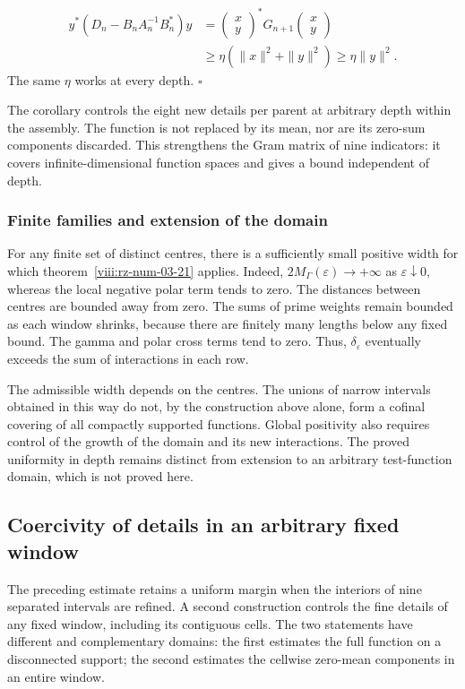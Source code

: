 \[
\begin{aligned}
y^*(D_n-B_nA_n^{-1}B_n^*)y
&=\begin{pmatrix}x\\y\end{pmatrix}^*G_{n+1}
\begin{pmatrix}x\\y\end{pmatrix}\\
&\geq\eta(\|x\|^2+\|y\|^2)\geq\eta\|y\|^2.
\end{aligned}
\]
The same \(\eta\) works at every depth. \hfill\(\square\)

The corollary controls the eight new details per parent at arbitrary depth within the assembly. The function is not replaced by its mean, nor are its zero-sum components discarded. This strengthens the Gram matrix of nine indicators: it covers infinite-dimensional function spaces and gives a bound independent of depth.

\subsubsection*{Finite families and extension of the domain}
For any finite set of distinct centres, there is a sufficiently small positive width for which theorem~\ref{viii:rz-num-03-21} applies. Indeed, \(2M_\Gamma(\varepsilon)\to+\infty\) as \(\varepsilon\downarrow0\), whereas the local negative polar term tends to zero. The distances between centres are bounded away from zero. The sums of prime weights remain bounded as each window shrinks, because there are finitely many lengths below any fixed bound. The gamma and polar cross terms tend to zero. Thus, \(\delta_\varepsilon\) eventually exceeds the sum of interactions in each row.

The admissible width depends on the centres. The unions of narrow intervals obtained in this way do not, by the construction above alone, form a cofinal covering of all compactly supported functions. Global positivity also requires control of the growth of the domain and its new interactions. The proved uniformity in depth remains distinct from extension to an arbitrary test-function domain, which is not proved here.

\subsection{Coercivity of details in an arbitrary fixed window}
\label{viii:rz:detalles}
The preceding estimate retains a uniform margin when the interiors of nine separated intervals are refined. A second construction controls the fine details of any fixed window, including its contiguous cells. The two statements have different and complementary domains: the first estimates the full function on a disconnected support; the second estimates the cellwise zero-mean components in an entire window.


